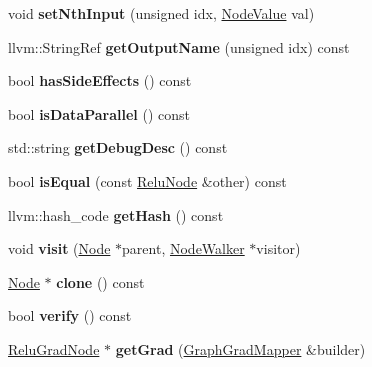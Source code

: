 \begin{DoxyCompactItemize}
void {\bfseries set\+Nth\+Input} (unsigned idx, \hyperlink{structglow_1_1_node_value}{Node\+Value} val)
\item 
\mbox{\label{classglow_1_1_relu_node_acfc81b634a3be071792f81f3770fd12d}} 
llvm\+::\+String\+Ref {\bfseries get\+Output\+Name} (unsigned idx) const
\item 
\mbox{\label{classglow_1_1_relu_node_a59830517571b949d7d5074d1d6cb8546}} 
bool {\bfseries has\+Side\+Effects} () const
\item 
\mbox{\label{classglow_1_1_relu_node_ae502df9721be82c0f4c5a2bec8943380}} 
bool {\bfseries is\+Data\+Parallel} () const
\item 
\mbox{\label{classglow_1_1_relu_node_a39bfb12899851335e77e3c0c89803be4}} 
std\+::string {\bfseries get\+Debug\+Desc} () const
\item 
\mbox{\label{classglow_1_1_relu_node_acedb618ca580440fe9476a913a4cd733}} 
bool {\bfseries is\+Equal} (const \hyperlink{classglow_1_1_relu_node}{Relu\+Node} \&other) const
\item 
\mbox{\label{classglow_1_1_relu_node_a1a854124317651a64e75ba9b09022ab7}} 
llvm\+::hash\+\_\+code {\bfseries get\+Hash} () const
\item 
\mbox{\label{classglow_1_1_relu_node_a4694f56ed60a923136dc8e5e25381796}} 
void {\bfseries visit} (\hyperlink{classglow_1_1_node}{Node} $\ast$parent, \hyperlink{classglow_1_1_node_walker}{Node\+Walker} $\ast$visitor)
\item 
\mbox{\label{classglow_1_1_relu_node_aed0ee726110266886254e286e024feef}} 
\hyperlink{classglow_1_1_node}{Node} $\ast$ {\bfseries clone} () const
\item 
\mbox{\label{classglow_1_1_relu_node_a97adc056e6107e543dcf2b887cf00b3e}} 
bool {\bfseries verify} () const
\item 
\mbox{\label{classglow_1_1_relu_node_a1ba474495023d52e0011c119b98cd328}} 
\hyperlink{classglow_1_1_relu_grad_node}{Relu\+Grad\+Node} $\ast$ {\bfseries get\+Grad} (\hyperlink{classglow_1_1_graph_grad_mapper}{Graph\+Grad\+Mapper} \&builder)
\end{DoxyCompactItemize}
